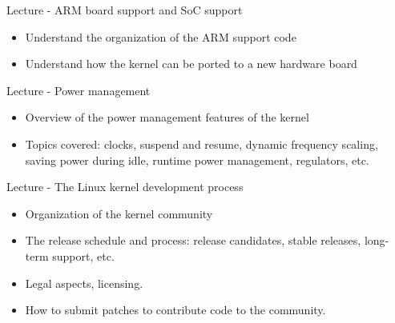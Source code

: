 \documentclass[a4paper,12pt,obeyspaces,spaces,hyphens]{article}
\begin{document}
\feagendatwocolumn
{Lecture - ARM board support and SoC support}
{
  \begin{itemize}
  \item Understand the organization of the ARM support code
  \item Understand how the kernel can be ported to a new hardware
    board
  \end{itemize}
}
{Lecture - Power management}
{
  \begin{itemize}
  \item Overview of the power management features of the kernel
  \item Topics covered: clocks, suspend and resume, dynamic frequency
    scaling, saving power during idle, runtime power management,
    regulators, etc.
  \end{itemize}
}

\feagendaonecolumn
{Lecture - The Linux kernel development process}
{
  \begin{itemize}
  \item Organization of the kernel community
  \item The release schedule and process: release candidates, stable
    releases, long-term support, etc.
  \item Legal aspects, licensing.
  \item How to submit patches to contribute code to the community.
  \end{itemize}
}

 
\end{document}
